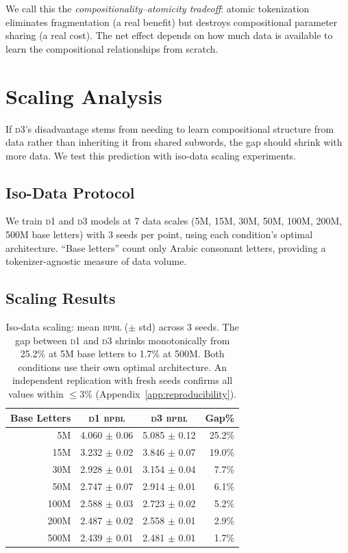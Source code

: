 \documentclass[11pt]{article}
\newcommand{\dOne}{\textsc{d1}}
\newcommand{\dThree}{\textsc{d3}}
\newcommand{\bpbl}{\textsc{bpbl}}
\begin{document}
We call this the \emph{compositionality--atomicity tradeoff}: atomic tokenization eliminates fragmentation (a real benefit) but destroys compositional parameter sharing (a real cost).
The net effect depends on how much data is available to learn the compositional relationships from scratch.

\section{Scaling Analysis}
\label{sec:scaling}

If \dThree{}'s disadvantage stems from needing to learn compositional structure from data rather than inheriting it from shared subwords, the gap should shrink with more data.
We test this prediction with iso-data scaling experiments.

\subsection{Iso-Data Protocol}

We train \dOne{} and \dThree{} models at 7 data scales (5M, 15M, 30M, 50M, 100M, 200M, 500M base letters) with 3 seeds per point, using each condition's optimal architecture.
``Base letters'' count only Arabic consonant letters, providing a tokenizer-agnostic measure of data volume.

\subsection{Scaling Results}

\begin{table}[t]
\centering
\small
\begin{tabular}{@{}rccr@{}}
\toprule
\textbf{Base Letters} & \textbf{\dOne{} \bpbl{}} & \textbf{\dThree{} \bpbl{}} & \textbf{Gap\%} \\
\midrule
5M   & 4.060 $\pm$ 0.06 & 5.085 $\pm$ 0.12 & 25.2\% \\
15M  & 3.232 $\pm$ 0.02 & 3.846 $\pm$ 0.07 & 19.0\% \\
30M  & 2.928 $\pm$ 0.01 & 3.154 $\pm$ 0.04 & 7.7\% \\
50M  & 2.747 $\pm$ 0.07 & 2.914 $\pm$ 0.01 & 6.1\% \\
100M & 2.588 $\pm$ 0.03 & 2.723 $\pm$ 0.02 & 5.2\% \\
200M & 2.487 $\pm$ 0.02 & 2.558 $\pm$ 0.01 & 2.9\% \\
500M & 2.439 $\pm$ 0.01 & 2.481 $\pm$ 0.01 & 1.7\% \\
\bottomrule
\end{tabular}
\caption{Iso-data scaling: mean \bpbl{} ($\pm$ std) across 3 seeds. The gap between \dOne{} and \dThree{} shrinks monotonically from 25.2\% at 5M base letters to 1.7\% at 500M. Both conditions use their own optimal architecture. An independent replication with fresh seeds confirms all values within $\leq$3\% (Appendix~\ref{app:reproducibility}).}
\label{tab:scaling}
\end{table}
\end{document}
